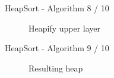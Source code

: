 \documentclass[notes=hide,pdftex,14pt]{beamer}
\begin{document}
\begin{frame}{HeapSort - Algorithm 8 / 10}
  \begin{centering}
   \begin{figure}[!h]%
     \begin{columns}%
       \begin{column}{0.425\textwidth}%
         \begin{adjustbox}{width=\linewidth}%
         \end{adjustbox}%
       \end{column}%
       \begin{column}{0.425\textwidth}%
          \begin{adjustbox}{width=\linewidth}%
          \end{adjustbox}%
        \end{column}%
      \end{columns}%
      \caption{Heapify upper layer}%
      \label{fig:heapify_upper}%
    \end{figure}
  \end{centering}
\end{frame}


\begin{frame}{HeapSort - Algorithm 9 / 10}
  \begin{centering}
    \begin{figure}[!h]
      \begin{adjustbox}{width=0.425\linewidth}%
      \end{adjustbox}%
      \caption{Resulting heap}%
      \label{fig:heapify_upper_final}%
    \end{figure}
  \end{centering}
\end{frame}

\end{document}
